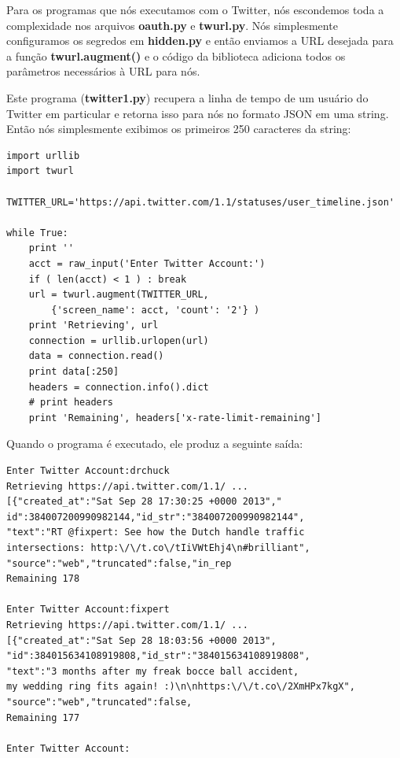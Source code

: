 Para os programas que nós executamos com o Twitter, nós escondemos toda
a complexidade nos arquivos {\bf oauth.py} e {\bf twurl.py}.
Nós simplesmente configuramos os segredos em {\bf hidden.py}
e então enviamos a URL desejada para a função 
{\bf twurl.augment()} e o código da biblioteca adiciona todos
os parâmetros necessários à URL para nós.

Este programa ({\bf twitter1.py}) recupera a linha de tempo
de um usuário do Twitter em particular e retorna isso para nós
no formato JSON em uma string. Então nós simplesmente exibimos
os primeiros 250 caracteres da string:

\beforeverb
\begin{verbatim}
import urllib
import twurl

TWITTER_URL='https://api.twitter.com/1.1/statuses/user_timeline.json'

while True:
    print ''
    acct = raw_input('Enter Twitter Account:')
    if ( len(acct) < 1 ) : break
    url = twurl.augment(TWITTER_URL,
        {'screen_name': acct, 'count': '2'} )
    print 'Retrieving', url
    connection = urllib.urlopen(url)
    data = connection.read()
    print data[:250]
    headers = connection.info().dict
    # print headers
    print 'Remaining', headers['x-rate-limit-remaining']
\end{verbatim}
\afterverb

Quando o programa é executado, ele produz a seguinte saída:
 
\beforeverb
\begin{verbatim}
Enter Twitter Account:drchuck
Retrieving https://api.twitter.com/1.1/ ...
[{"created_at":"Sat Sep 28 17:30:25 +0000 2013","
id":384007200990982144,"id_str":"384007200990982144",
"text":"RT @fixpert: See how the Dutch handle traffic 
intersections: http:\/\/t.co\/tIiVWtEhj4\n#brilliant",
"source":"web","truncated":false,"in_rep
Remaining 178

Enter Twitter Account:fixpert
Retrieving https://api.twitter.com/1.1/ ...
[{"created_at":"Sat Sep 28 18:03:56 +0000 2013",
"id":384015634108919808,"id_str":"384015634108919808",
"text":"3 months after my freak bocce ball accident, 
my wedding ring fits again! :)\n\nhttps:\/\/t.co\/2XmHPx7kgX",
"source":"web","truncated":false,
Remaining 177

Enter Twitter Account:
\end{verbatim}
\afterverb

